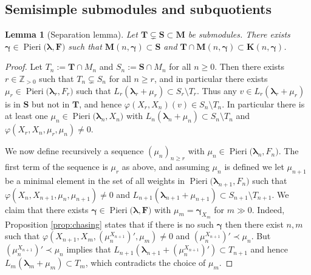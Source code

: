 \documentclass[11pt,fleqn]{amsart}
\newcommand\ZZ{\mathbb Z}
\renewcommand\phi{\varphi}
\newtheorem{lem}[thm]{Lemma}
\theoremstyle{definition}
\theoremstyle{remark}
\theoremstyle{remark}
\newcommand\wt[1]{\boldsymbol{#1}}
\newcommand\Pieri[2]{\operatorname{Pieri}{(#1},{#2)}}
\newcommand\map[4]{\phi(#3,#4,#1,#2)}
\begin{document}
\subsection{Semisimple submodules and subquotients}

\begin{lem}[Separation lemma]
\label{lem:mk-separation}
Let $\mathbf T \subsetneq \mathbf S \subset \mathbf M$ be submodules.  
There exists $\wt\gamma \in\Pieri{\wt\lambda}{\mathbf F}$ such that $\mathbf 
M(n, \wt\gamma) \subset \mathbf S$ and $\mathbf T \cap \mathbf M(n,
\wt\gamma) \subset \mathbf K(n, \wt\gamma)$.
\end{lem} 
\begin{proof}
Let $T_n := \mathbf T \cap M_n$ and $S_n := \mathbf S \cap M_n$ for all $n \geq 
0$. Then there exists $r \in \ZZ_{>0}$ such that $T_n \subsetneq S_n$ for all 
$n \geq r$, and in particular there exists $\mu_r \in \Pieri{\wt\lambda_r}{F_r}$ 
such that $L_r(\wt\lambda_r + \mu_r) \subset S_r \setminus T_r$. Thus any 
$v \in L_r(\wt\lambda_r + \mu_r)$ is in $\mathbf S$ but not in $\mathbf T$, and 
hence $\phi(X_r,X_n)(v) \in S_n \setminus T_n$. In particular there is at least 
one $\mu_n \in \Pieri{\wt\lambda_n}{X_n}$ with $L_n(\wt\lambda_n + \mu_n)
\subset S_n \setminus T_n$ and $\map{\mu_r}{\mu_n}{X_r}{X_n} \neq 0$. 

We now define recursively a sequence $(\mu_n)_{n \geq r}$ with $\mu_n \in 
\Pieri{\wt\lambda_n}{F_n}$. The first term of the sequence is $\mu_r$ as above, 
and assuming $\mu_n$ is defined we let $\mu_{n+1}$ be a minimal element in 
the set of all weights in $\Pieri{\wt\lambda_{n+1}}{F_n}$ such that 
$\map{\mu_n}{\mu_{n+1}}{X_n}{X_{n+1}} \neq 0$ and $L_{n+1}(\wt\lambda_{n+1} + 
\mu_{n+1}) \subset S_{n+1} \setminus T_{n+1}$. We claim that there exists 
$\wt\gamma \in \Pieri{\wt\lambda}{\mathbf F}$ with $\mu_m = 
\wt\gamma_{X_m}$ for $m \gg 0$. Indeed, Proposition \ref{prop:chasing} states that if there is no such 
$\wt\gamma$ then there exist $n,m$ such that $\map{(\mu_n^{X_{n+1}})'}{\mu_m}
{X_{n+1}}{X_m} \neq 0$ and $(\mu_n^{X_{n+1}})' \prec \mu_n$. But 
$(\mu_n^{X_{n+1}})' \prec \mu_n$ implies that $L_{n+1}(\wt\lambda_{n+1} + 
(\mu_n^{X_{n+1}})') \subset T_{n+1}$ and hence $L_m(\wt\lambda_m + \mu_m)
\subset T_m$, which contradicts the choice of $\mu_m$.
\end{proof}
\end{document}
